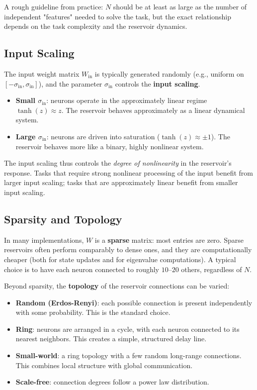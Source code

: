 A rough guideline from practice: $N$ should be at least as large as the number of independent "features" needed to solve the task, but the exact relationship depends on the task complexity and the reservoir dynamics.

\subsection{Input Scaling}\label{sec:14.4.3}

The input weight matrix $W_{\text{in}}$ is typically generated randomly (e.g., uniform on $[-\sigma_{\text{in}}, \sigma_{\text{in}}]$), and the parameter $\sigma_{\text{in}}$ controls the \textbf{input scaling}.

\begin{itemize}[nosep]
  \item \textbf{Small $\sigma_{\text{in}}$}: neurons operate in the approximately linear regime $\tanh(z) \approx z$. The reservoir behaves approximately as a linear dynamical system.
  \item \textbf{Large $\sigma_{\text{in}}$}: neurons are driven into saturation ($\tanh(z) \approx \pm 1$). The reservoir behaves more like a binary, highly nonlinear system.
\end{itemize}

The input scaling thus controls the \textit{degree of nonlinearity} in the reservoir's response. Tasks that require strong nonlinear processing of the input benefit from larger input scaling; tasks that are approximately linear benefit from smaller input scaling.

\subsection{Sparsity and Topology}\label{sec:14.4.4}

In many implementations, $W$ is a \textbf{sparse} matrix: most entries are zero. Sparse reservoirs often perform comparably to dense ones, and they are computationally cheaper (both for state updates and for eigenvalue computations). A typical choice is to have each neuron connected to roughly $10$--$20$ others, regardless of $N$.

Beyond sparsity, the \textbf{topology} of the reservoir connections can be varied:

\begin{itemize}[nosep]
  \item \textbf{Random (Erdos-Renyi)}: each possible connection is present independently with some probability. This is the standard choice.
  \item \textbf{Ring}: neurons are arranged in a cycle, with each neuron connected to its nearest neighbors. This creates a simple, structured delay line.
  \item \textbf{Small-world}: a ring topology with a few random long-range connections. This combines local structure with global communication.
  \item \textbf{Scale-free}: connection degrees follow a power law distribution.
\end{itemize}


